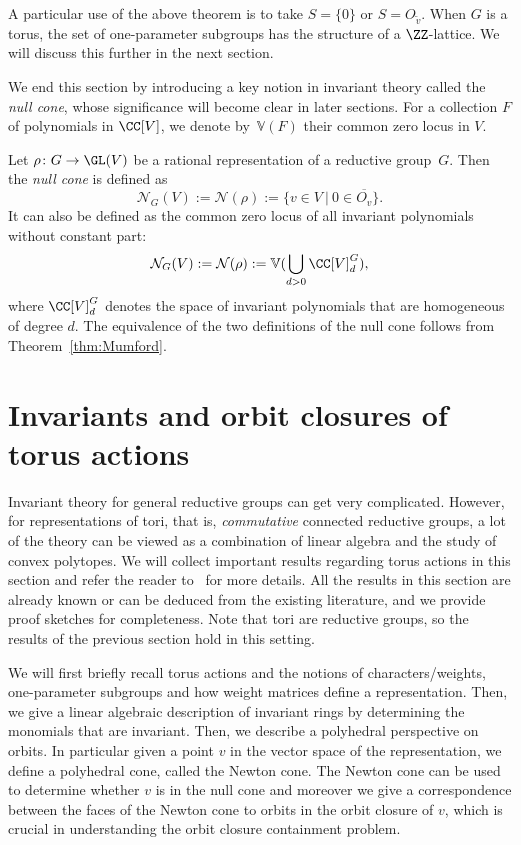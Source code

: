 A particular use of the above theorem is to take $S = \{0\}$ or $S = O_{\tilde v}$.
When $G$ is a torus, the set of one-parameter subgroups has the structure of a $\ZZ$-lattice. We will discuss this further in the next section.


We end this section by introducing a key notion in invariant theory called the \emph{null cone}, whose significance will become clear in later sections.
For a collection $F$ of polynomials in $\CC[V]$, we denote by~$\mathbb{V}(F)$ their common zero locus in $V$.

\begin{definition}\label{def:null}
Let $\rho\colon G \rightarrow \GL(V)$ be a rational representation of a reductive group~$G$.
Then the \emph{null cone} is defined as
\[
\mathcal{N}_G(V) := \mathcal{N}(\rho) := \{v \in V\ |\ 0 \in \overline{O_v}\}.
\]
It can also be defined as the common zero locus of all invariant polynomials without constant part:
\[
\mathcal{N}_G(V) := \mathcal{N}(\rho) := \mathbb{V}(\bigcup_{d > 0} \CC[V]^G_d),
\]
where $\CC[V]^G_d$ denotes the space of invariant polynomials that are homogeneous of degree $d$.
The equivalence of the two definitions of the null cone follows from Theorem~\ref{thm:Mumford}.
\end{definition}

%
\section{Invariants and orbit closures of torus actions}\label{sec:rep-tori}
%
Invariant theory for general reductive groups can get very complicated.
However, for representations of tori, that is, \emph{commutative} connected reductive groups, a lot of the theory can be viewed as a combination of linear algebra and the study of convex polytopes.
We will collect important results regarding torus actions in this section and refer the reader to~\cite{Wehlau93, DK} for more details.
All the results in this section are already known or can be deduced from the existing literature, and we provide proof sketches for completeness.
Note that tori are reductive groups, so the results of the previous section hold in this setting.

We will first briefly recall torus actions and the notions of characters/weights, one-parameter subgroups and how weight matrices define a representation. Then, we give a linear algebraic description of invariant rings by determining the monomials that are invariant. Then, we describe a polyhedral perspective on orbits. In particular given a point $v$ in the vector space of the representation, we define a polyhedral cone, called the Newton cone. The Newton cone can be used to determine whether $v$ is in the null cone and moreover we give a correspondence between the faces of the Newton cone to orbits in the orbit closure of $v$, which is crucial in understanding the orbit closure containment problem.

